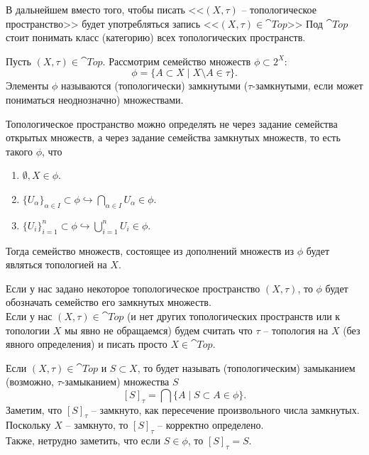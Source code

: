 \begin{notet}
    В дальнейшем вместо того, чтобы писать <<$(X, \tau)$ -- топологическое пространство>> будет употребляться запись <<$(X, \tau) \in \cat{Top}$>>
    Под $\cat{Top}$ стоит понимать класс (категорию) всех топологических пространств.
\end{notet}
\begin{definition}
    Пусть $(X, \tau) \in \cat{Top}$.
    Рассмотрим семейство множеств $\phi \subset 2^X\colon$
    \[
        \phi = \{ A \subset X \mid X \setminus A \in \tau \}.
    \]
    Элементы $\phi$ называются (топологически) замкнутыми ($\tau$-замкнутыми, если может пониматься неоднозначно) множествами.
\end{definition}
\begin{note}
    Топологическое пространство можно определять не через задание семейства открытых множеств, а через задание семейства замкнутых множеств, то есть такого $\phi$, что
    \begin{enumerate}
        \item $\emptyset, X \in \phi$.
        \item $\{U_\alpha\}_{\alpha \in I} \subset \phi \hookrightarrow \bigcap_{\alpha \in I} U_\alpha \in \phi$.
        \item $\{U_i\}_{i = 1}^n \subset \phi \hookrightarrow \bigcup_{i = 1}^n U_i \in \phi$.
    \end{enumerate}
    Тогда семейство множеств, состоящее из дополнений множеств из $\phi$ будет являться топологией на $X$.
\end{note}
\begin{notet}
    Если у нас задано некоторое топологическое пространство $(X, \tau)$, то $\phi$ будет обозначать семейство его замкнутых множеств. \\
    Если у нас $(X, \tau) \in \cat{Top}$ (и нет других топологических пространств или к топологии $X$ мы явно не обращаемся) будем считать что $\tau$ -- топология на $X$ (без явного определения) и писать просто $X \in \cat{Top}$.
\end{notet}
\begin{definition}
    Если $(X, \tau) \in \cat{Top}$ и $S \subset X$, то будет называть (топологическим) замыканием (возможно, $\tau$-замыканием) множества $S$
    \[
        [S]_{\tau} = \bigcap \{A \mid S \subset A \in \phi\}.
    \]
     Заметим, что $[S]_\tau$ -- замкнуто, как пересечение произвольного числа замкнутых. \\
     Поскольку $X$ -- замкнуто, то $[S]_\tau$ -- корректно определено. \\
    Также, нетрудно заметить, что если $S \in \phi$, то $[S]_\tau = S$.
\end{definition}
